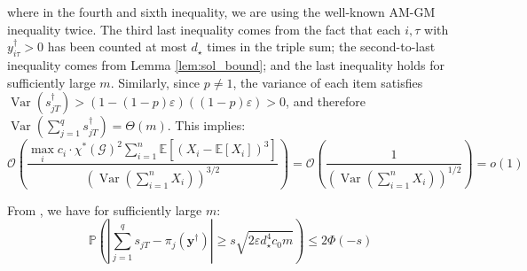 \documentclass[nonblindrev]{informs3noheader}
\DeclareMathOperator{\Var}{Var}
\def\E{\mathbb{E}}
\def\P{\mathbb{P}}
\def\calG{\mathcal{G}}
\def\calO{\mathcal{O}}
\def\by{\boldsymbol{y}}
\begin{document}
where in the fourth and sixth inequality, we are using the well-known AM-GM inequality twice. The third last inequality comes from the fact that each $i,\tau$ with $y^\dagger_{i\tau}>0$ has been counted at most $d_\star$ times in the triple sum; the second-to-last inequality comes from Lemma \ref{lem:sol_bound}; and the last inequality holds for sufficiently large $m$. Similarly, since $p\neq1$, the variance of each item satisfies  $\Var(s^\dagger_{jT})>(1-(1-p)\varepsilon)((1-p)\varepsilon)>0$, and therefore $\Var\left(\sum_{j=1}^q s^\dagger_{jT}\right)=\Theta(m)$. This implies:
\[\calO\left(\frac{\max_{i} c_i \cdot \chi^*(\calG)^2 \sum_{i=1}^n \E\left[(X_i-\E[X_i])^3\right]}{\left(\Var\left(\sum_{i=1}^n X_i\right)\right)^{3/2}}\right)=\calO\left(\frac{1}{\left(\Var\left(\sum_{i=1}^n X_i\right)\right)^{1/2}}\right)=o(1)\]

From \cite{janisch2024berry}, we have for sufficiently large $m$:
\[\P\left(\left|\sum_{j=1}^q s_{jT} - \pi_{j}(\by^\dagger)\right|\geq s\sqrt{2\varepsilon d_\star^4 c_0 m}\right)\leq2\Phi(-s) \]
\end{document}
